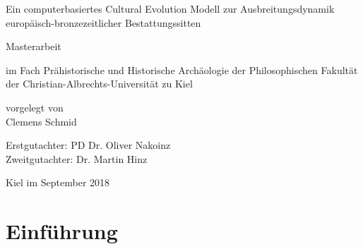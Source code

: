 \documentclass[openany,twoside,twocolumn]{book}
\title{}
\author{}
\date{}
\begin{document}
\begin{titlepage}

  \vspace*{\fill}

    \begin{center}

        \Huge Ein computerbasiertes Cultural Evolution Modell zur Ausbreitungsdynamik europäisch-bronzezeitlicher Bestattungssitten

        \vspace{2cm}

        \huge Masterarbeit

        \large im Fach Prähistorische und Historische Archäologie der Philosophischen Fakultät der Christian-Albrechts-Universität zu Kiel

        \vspace{2cm}

        \large vorgelegt von \\
        \huge Clemens Schmid

    \end{center}

\vspace{4cm}

\large Erstgutachter: PD Dr. Oliver Nakoinz \\
\large Zweitgutachter: Dr. Martin Hinz

\vspace{1cm}

\large Kiel im September 2018

  \vspace*{\fill}

\end{titlepage}

\renewcommand{\chaptermark}[1]{\markboth{#1}{}}
\renewcommand{\sectionmark}[1]{\markright{\thesection\ #1}}
\fancyhf{}
\fancyhead[LE,RO]{\textbf{\thepage}}
\fancyhead[LO]{\textbf{\nouppercase{\rightmark}}}
\fancyhead[RE]{\textbf{\nouppercase{\leftmark}}}

\setcounter{tocdepth}{3}
\tableofcontents

\parskip 4pt
\setlength{\textfloatsep}{10pt plus 1.0pt minus 2.0pt}

\AtEndDocument{
  
}

\nonfrenchspacing

\hypertarget{intro}{%
\chapter{Einführung}\label{intro}}
\end{document}
